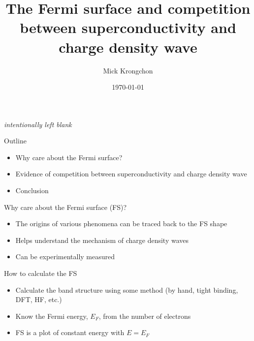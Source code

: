 \documentclass{beamer}
\title[]{The Fermi surface and competition between superconductivity and charge density wave}
\author{Mick Krongchon}
\institute{University of Illinois at Urbana-Champaign}
\date{\today}
\begin{document}
\begin{frame}
\titlepage
\end{frame}

\begin{frame}{}
\centering
\textit{intentionally left blank}
\end{frame}

\begin{frame}{Outline}
\begin{itemize}
\item Why care about the Fermi surface?
\item Evidence of competition between superconductivity and charge density wave
\item Conclusion
\end{itemize}
\end{frame}

\begin{frame}{Why care about the Fermi surface (FS)?}
\begin{itemize}
  \item The origins of various phenomena can be traced back to the FS shape
  \item Helps understand the mechanism of charge density waves
  \item Can be experimentally measured



\end{itemize}
\end{frame}

\begin{frame}{How to calculate the FS}
\begin{itemize}
\item Calculate the band structure using some method (by hand, tight binding, DFT, HF, etc.)
\item Know the Fermi energy, $E_F$, from the number of electrons
\item FS is a plot of constant energy with $E = E_F$
\end{itemize}
\end{frame}
\end{document}
